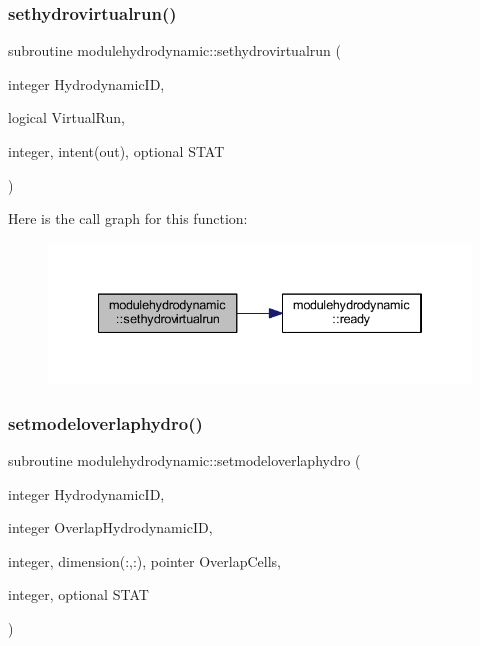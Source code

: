 \subsubsection{\texorpdfstring{sethydrovirtualrun()}{sethydrovirtualrun()}}
{\footnotesize\ttfamily subroutine modulehydrodynamic\+::sethydrovirtualrun (\begin{DoxyParamCaption}\item[{integer}]{Hydrodynamic\+ID,  }\item[{logical}]{Virtual\+Run,  }\item[{integer, intent(out), optional}]{S\+T\+AT }\end{DoxyParamCaption})\hspace{0.3cm}{\ttfamily [private]}}

Here is the call graph for this function\+:\nopagebreak
\begin{figure}[H]
\begin{center}
\leavevmode
\includegraphics[width=334pt]{namespacemodulehydrodynamic_a429223ac8f920fd2b743524bf353e8c1_cgraph}
\end{center}
\end{figure}
\mbox{\label{namespacemodulehydrodynamic_abd4cedd7ee17aecf0de70d7616270033}} 
\subsubsection{\texorpdfstring{setmodeloverlaphydro()}{setmodeloverlaphydro()}}
{\footnotesize\ttfamily subroutine modulehydrodynamic\+::setmodeloverlaphydro (\begin{DoxyParamCaption}\item[{integer}]{Hydrodynamic\+ID,  }\item[{integer}]{Overlap\+Hydrodynamic\+ID,  }\item[{integer, dimension(\+:,\+:), pointer}]{Overlap\+Cells,  }\item[{integer, optional}]{S\+T\+AT }\end{DoxyParamCaption})\hspace{0.3cm}{\ttfamily [private]}}

